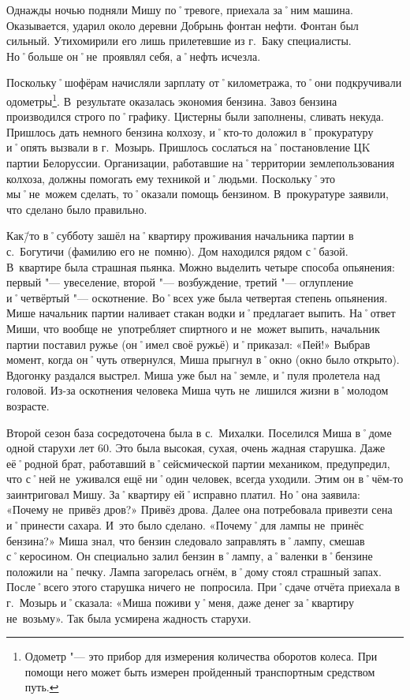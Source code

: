 Однажды ночью подняли Мишу по˚тревоге, приехала за˚ним машина. Оказывается, ударил около деревни Добрынь фонтан нефти. Фонтан был сильный. Утихомирили его лишь прилетевшие из г.~Баку специалисты. Но˚больше он˚не~проявлял себя, а˚нефть исчезла. 

Поскольку˚шофёрам начисляли зарплату от˚километража, то˚они подкручивали одометры\footnote
{Одометр "--- это прибор для измерения количества оборотов колеса. При помощи него может быть измерен пройденный транспортным средством путь.}. В~результате оказалась экономия бензина. Завоз бензина производился строго по˚графику. Цистерны были заполнены, сливать некуда. Пришлось дать немного бензина колхозу, и˚кто-то доложил в˚прокуратуру и˚опять вызвали в г.~Мозырь. Пришлось сослаться на˚постановление ЦK партии Белоруссии. Организации, работавшие на˚территории землепользования колхоза, должны помогать ему техникой и˚людьми. Поскольку˚это мы˚не~можем сделать, то˚оказали помощь бензином. В~прокуратуре заявили, что сделано было правильно.

Как\=/то в˚субботу зашёл на˚квартиру проживания начальника партии в с.~Богутичи (фамилию его не~помню). Дом находился рядом с˚базой. В~квартире была страшная пьянка. Можно выделить четыре способа опьянения: первый "--- увеселение, второй "--- возбуждение, третий "--- оглупление и˚четвёртый "--- оскотнение. Во˚всех уже была четвертая степень опьянения. Мише начальник партии наливает стакан водки и˚предлагает выпить. На˚ответ Миши, что вообще не~употребляет спиртного и не~может выпить, начальник партии поставил ружье (он˚имел своё ружьё) и˚приказал: «Пей!» Выбрав момент, когда он˚чуть отвернулся, Миша прыгнул в˚окно (окно было открыто). Вдогонку раздался выстрел. Миша уже был на˚земле, и˚пуля пролетела над головой. Из-за оскотнения человека Миша чуть не~лишился жизни в˚молодом возрасте.

Второй сезон база сосредоточена была в с.~Михалки. Поселился Миша в˚доме одной старухи лет 60. Это была высокая, сухая, очень жадная старушка. Даже её˚родной брат, работавший в˚сейсмической партии механиком, предупредил, что с˚ней не~уживался ещё ни˚один человек, всегда уходили. Этим он в˚чём-то заинтриговал Мишу. За˚квартиру ей˚исправно платил. Но˚она заявила: «Почему не~привёз  дров?» Привёз дрова. Далее она потребовала привезти сена и˚принести сахара. И~это было сделано. «Почему˚для лампы не~принёс бензина?» Миша знал, что бензин следовало заправлять в˚лампу, смешав с˚керосином. Он специально залил бензин в˚лампу, а˚валенки в˚бензине положили на˚печку. Лампа загорелась огнём, в˚дому стоял страшный запах. После˚всего этого старушка ничего не~попросила. При˚сдаче отчёта приехала в г.~Мозырь и˚сказала: «Миша поживи у˚меня, даже денег за˚квартиру не~возьму». Так была усмирена жадность старухи.

